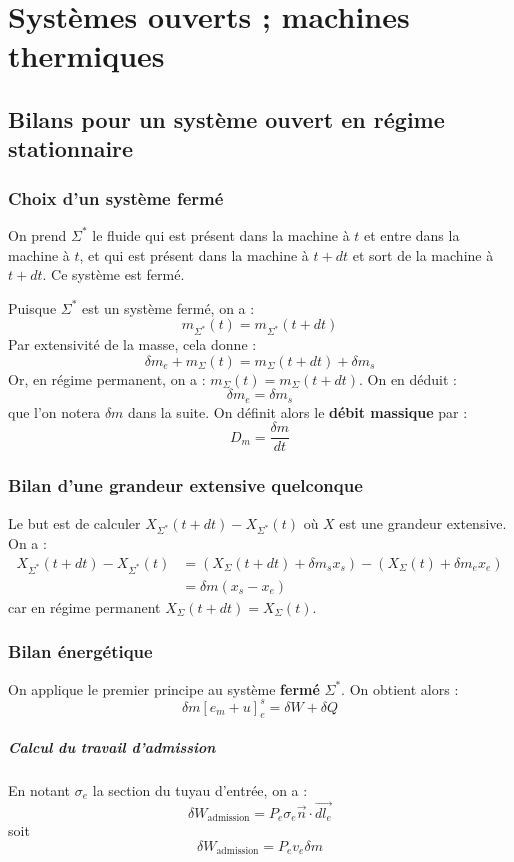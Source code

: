 \documentclass[french]{book}
\theoremstyle{plain}
\theoremstyle{definition}
\theoremstyle{remark}
\newcommand{\st}{^*}
\begin{document}
\chapter{Systèmes ouverts ; machines thermiques}
\localtableofcontents
\section{Bilans pour un système ouvert en régime stationnaire}
\subsection{Choix d'un système fermé}
On prend $\Sigma\st$ le fluide qui est présent dans la machine à $t$ et entre dans la machine à $t$, et qui est présent dans la machine à $t+dt$ et sort de la machine à $t+dt$. Ce système est fermé. \\ \par Puisque $\Sigma\st$ est un système fermé, on a : $$m_{\Sigma\st}(t)=m_{\Sigma\st}(t+dt)$$ Par extensivité de la masse, cela donne : $$\delta m_e+m_{\Sigma}(t)=m_{\Sigma}(t+dt)+\delta m_s$$ Or, en régime permanent, on a : $m_{\Sigma}(t)=m_{\Sigma}(t+dt)$. On en déduit : $$\delta m_e=\delta m_s$$ que l'on notera $\delta m$ dans la suite. On définit alors le \textbf{débit massique} par : $$D_m=\frac{\delta m}{dt}$$
\subsection{Bilan d'une grandeur extensive quelconque} Le but est de calculer $X_{\Sigma\st}(t+dt)-X_{\Sigma\st}(t)$ où $X$ est une grandeur extensive. On a : \begin{align*}
	X_{\Sigma\st}(t+dt)-X_{\Sigma\st}(t)&=\left(X_{\Sigma}(t+dt)+\delta m_s x_s\right)-\left(X_{\Sigma}(t)+\delta m_e x_e\right)\\
	&= \delta m\left(x_s-x_e\right)
\end{align*} car en régime permanent $X_{\Sigma}(t+dt)=X_{\Sigma}(t)$.
\subsection{Bilan énergétique}
On applique le premier principe au système \textbf{fermé} $\Sigma\st$. On obtient alors : $$\delta m\left[e_m+u\right]_e^s=\delta W+\delta Q$$
\paragraph{Calcul du travail d'admission} En notant $\sigma_e$ la section du tuyau d'entrée, on a : $$\delta W_{\text{admission}}=P_e\sigma_e\overrightarrow{n}\cdot\overrightarrow{dl_e}$$ soit $$\delta W_{\text{admission}}=P_ev_e\delta m$$
\end{document}
